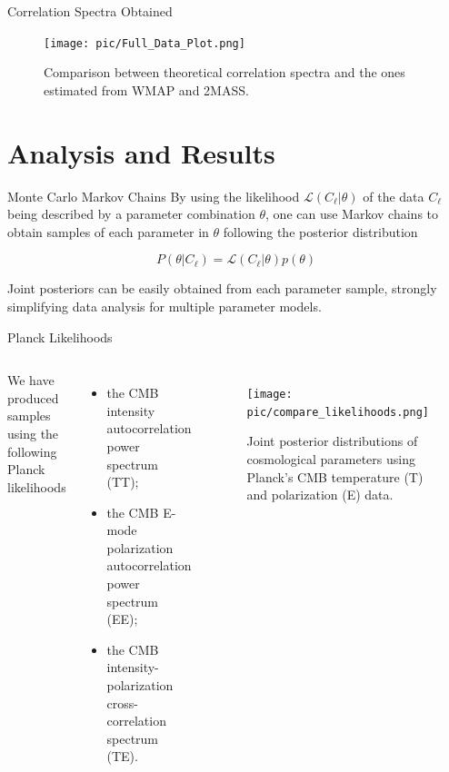 \documentclass[serif, aspectratio=169]{beamer}
\begin{document}
\begin{frame}{Correlation Spectra Obtained}
    \begin{figure}
        \centering
        \texttt{[image: pic/Full\_Data\_Plot.png]}
        \caption{Comparison between theoretical correlation spectra and the ones estimated from WMAP and 2MASS.}
        \label{fig:correlations_obtained}
    \end{figure}
\end{frame}

\section{Analysis and Results}

\begin{frame}{Monte Carlo Markov Chains}
	By using the likelihood $\mathcal{L}(C_\ell|\theta)$ of the data $C_\ell$ being described by a parameter combination $\theta$, one can use Markov chains to obtain samples of each parameter in $\theta$ following the posterior distribution
	
	\begin{equation}
		P(\theta|C_\ell)=\mathcal{L}(C_\ell|\theta)p(\theta)
	\end{equation}
	
	Joint posteriors can be easily obtained from each parameter sample, strongly simplifying data analysis for multiple parameter models.
\end{frame}

\begin{frame}{Planck Likelihoods}
	\begin{columns}
	We have produced samples using the following Planck likelihoods
	
	\begin{itemize}
		\item the CMB intensity  autocorrelation power spectrum (TT);

		\item the CMB E-mode polarization  autocorrelation power spectrum (EE);

		\item the CMB intensity-polarization cross-correlation spectrum (TE).
	\end{itemize}
	\begin{figure}
	\centering
	\texttt{[image: pic/compare\_likelihoods.png]}
	\caption{Joint posterior distributions of cosmological parameters using Planck’s CMB temperature (T) and polarization (E) data.}
	\label{fig:Planck_posteriors}
	\end{figure}
	\end{columns}
\end{frame}
\end{document}
